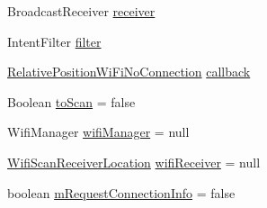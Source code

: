 \begin{DoxyCompactItemize}
\item 
Broadcast\-Receiver \hyperlink{classcs_1_1nsense_1_1location_1_1_wifi_access_point_a995e5ccfeb5917c63044060e17f6a751}{receiver}
\item 
Intent\-Filter \hyperlink{classcs_1_1nsense_1_1location_1_1_wifi_access_point_a8abf89fb56541865315ae6ca10e2246f}{filter}
\item 
\hyperlink{classcs_1_1nsense_1_1location_1_1_relative_position_wi_fi_no_connection}{Relative\-Position\-Wi\-Fi\-No\-Connection} \hyperlink{classcs_1_1nsense_1_1location_1_1_wifi_access_point_aa4ccc9d8d98e71518c3f53c9d58de630}{callback}
\item 
Boolean \hyperlink{classcs_1_1nsense_1_1location_1_1_wifi_access_point_aa14413027e5b08152a82d28e1d0167a8}{to\-Scan} = false
\item 
Wifi\-Manager \hyperlink{classcs_1_1nsense_1_1location_1_1_wifi_access_point_ae99d6dee6d3f9c42279da6ce87ff9a56}{wifi\-Manager} = null
\item 
\hyperlink{classcs_1_1nsense_1_1location_1_1_wifi_access_point_1_1_wifi_scan_receiver_location}{Wifi\-Scan\-Receiver\-Location} \hyperlink{classcs_1_1nsense_1_1location_1_1_wifi_access_point_ad6ce8a0c2df158208998e575b588eb42}{wifi\-Receiver} = null
\item 
boolean \hyperlink{classcs_1_1nsense_1_1location_1_1_wifi_access_point_a766fd29223240520eb9b81a7e73311ce}{m\-Request\-Connection\-Info} = false
\end{DoxyCompactItemize}


